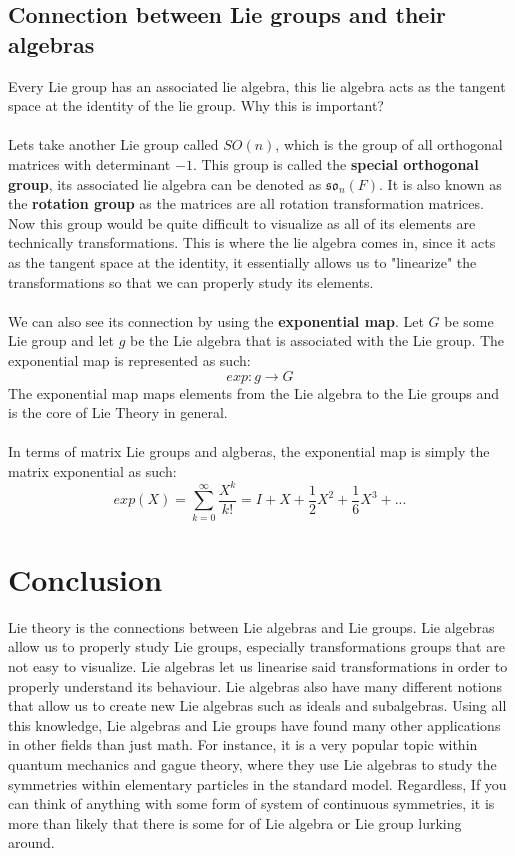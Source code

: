 \documentclass[12pt, letterpaper]{article}
\begin{document}
\subsection{Connection between Lie groups and their algebras}
Every Lie group has an associated lie algebra, this lie algebra acts as the tangent space at the identity of the lie group. Why this is important? \\\\
Lets take another Lie group called $SO(n)$, which is the group of all orthogonal matrices with determinant $-1$. This group is called the \textbf{special orthogonal group}, its associated lie algebra can be denoted as $\mathfrak{so}_n(F)$. It is also known as the \textbf{rotation group} as the matrices are all rotation transformation matrices. Now this group would be quite difficult to visualize as all of its elements are technically transformations. This is where the lie algebra comes in, since it acts as the tangent space at the identity, it essentially allows us to "linearize" the transformations so that we can properly study its elements.\\\\
We can also see its connection by using the \textbf{exponential map}. Let $G$ be some Lie group and let $g$ be the Lie algebra that is associated with the Lie group. The exponential map is represented as such:
\[ exp: g \rightarrow G \]
The exponential map maps elements from the Lie algebra to the Lie groups and is the core of Lie Theory in general. \\\\
In terms of matrix Lie groups and algberas, the exponential map is simply the matrix exponential as such:
\[ exp(X) = \sum^{\infty}_{k=0} \dfrac{X^k}{k!} = I + X + \dfrac{1}{2}X^2 + \dfrac{1}{6}X^3 + ...\]

\section{Conclusion}
Lie theory is the connections between Lie algebras and Lie groups. Lie algebras allow us to properly study Lie groups, especially transformations groups that are not easy to visualize. Lie algebras let us linearise said transformations in order to properly understand its behaviour. Lie algebras also have many different notions that allow us to create new Lie algebras such as ideals and subalgebras. Using all this knowledge, Lie algebras and Lie groups have found many other applications in other fields than just math. For instance, it is a very popular topic within quantum mechanics and gague theory, where they use Lie algebras to study the symmetries within elementary particles in the standard model. Regardless, If you can think of anything with some form of system of continuous symmetries, it is more than likely that there is some for of Lie algebra or Lie group lurking around.
\end{document}
